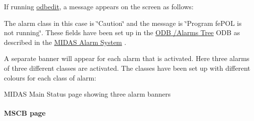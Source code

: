 \par
\par
\par
 \begin{center}  \par
\par
\par
  \end{center}  \par
\par
\par


\label{RC_mhttpd_Alarm_page_RC_odb_alarm_msg}
\hypertarget{RC_mhttpd_Alarm_page_RC_odb_alarm_msg}{}
 If running \hyperlink{RC_odbedit_utility}{odbedit}, a message appears on the screen as follows: 


The alarm class in this case is \char`\"{}Caution\char`\"{} and the message is \char`\"{}Program fePOL is not running\char`\"{}. These fields have been set up in the \hyperlink{RC_customize_ODB_RC_ODB_Alarms_Tree}{ODB /Alarms Tree} ODB as described in the \hyperlink{RC_customize_ODB_RC_Alarm_System}{MIDAS Alarm System} .

A separate banner will appear for each alarm that is activated. Here three alarms of three different classes are activated. The classes have been set up with different colours for each class of alarm: \par
\par
\par
 \begin{center}  MIDAS Main Status page showing three alarm banners \par
\par
\par
  \end{center}  \par
\par
\par




\par
 \label{index_end}
\hypertarget{index_end}{}
 \paragraph{MSCB page}\label{RC_mhttpd_MSCB_page}
\par
 \label{RC_mhttpd_MSCB_page_idx_mhttpd_page_MSCB}
\hypertarget{RC_mhttpd_MSCB_page_idx_mhttpd_page_MSCB}{}




